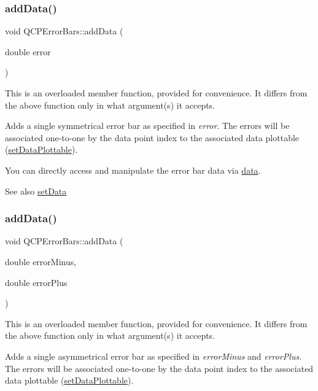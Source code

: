 \subsubsection{\texorpdfstring{add\+Data()}{addData()}\hspace{0.1cm}{\footnotesize\ttfamily [3/4]}}
{\footnotesize\ttfamily void Q\+C\+P\+Error\+Bars\+::add\+Data (\begin{DoxyParamCaption}\item[{double}]{error }\end{DoxyParamCaption})}

This is an overloaded member function, provided for convenience. It differs from the above function only in what argument(s) it accepts.

Adds a single symmetrical error bar as specified in {\itshape error}. The errors will be associated one-\/to-\/one by the data point index to the associated data plottable (\hyperlink{classQCPErrorBars_aabb42a964cfbf780cd1c79850c7cd989}{set\+Data\+Plottable}).

You can directly access and manipulate the error bar data via \hyperlink{classQCPErrorBars_aeebd1b14f4c3573565efafd514988813}{data}.

\begin{DoxySeeAlso}{See also}
\hyperlink{classQCPErrorBars_a92b1980003255f5f7c05407a4d92aabc}{set\+Data} 
\end{DoxySeeAlso}
\mbox{\label{classQCPErrorBars_a1833c5de9c2fe2952b977505d9f27cd1}} 
\subsubsection{\texorpdfstring{add\+Data()}{addData()}\hspace{0.1cm}{\footnotesize\ttfamily [4/4]}}
{\footnotesize\ttfamily void Q\+C\+P\+Error\+Bars\+::add\+Data (\begin{DoxyParamCaption}\item[{double}]{error\+Minus,  }\item[{double}]{error\+Plus }\end{DoxyParamCaption})}

This is an overloaded member function, provided for convenience. It differs from the above function only in what argument(s) it accepts.

Adds a single asymmetrical error bar as specified in {\itshape error\+Minus} and {\itshape error\+Plus}. The errors will be associated one-\/to-\/one by the data point index to the associated data plottable (\hyperlink{classQCPErrorBars_aabb42a964cfbf780cd1c79850c7cd989}{set\+Data\+Plottable}).

